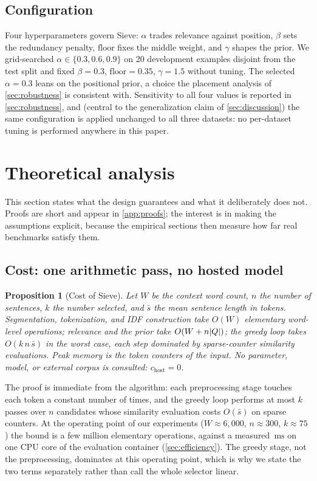 \documentclass[preprint,12pt]{elsarticle}
\DeclarePairedDelimiter\abs{\lvert}{\rvert}
\newtheorem{proposition}{Proposition}
\theoremstyle{remark}
\newcommand{\method}{Sieve}
\newcommand{\ms}{\ensuremath{\mathrm{ms}}}
\begin{document}
\subsection{Configuration}
Four hyperparameters govern \method{}: $\alpha$ trades relevance
against position, $\beta$ sets the redundancy penalty, $\mathrm{floor}$
fixes the middle weight, and $\gamma$ shapes the prior. We
grid-searched $\alpha \in \{0.3, 0.6, 0.9\}$ on 20 development
examples disjoint from the test split and fixed $\beta=0.3$,
$\mathrm{floor}=0.35$, $\gamma=1.5$ without tuning. The selected
$\alpha=0.3$ leans on the positional prior, a choice the placement
analysis of \autoref{sec:robustness} is consistent with. Sensitivity
to all four values is reported in \autoref{sec:robustness}, and
(central to the generalization claim of \autoref{sec:discussion}) the
same configuration is applied unchanged to all three datasets: no
per-dataset tuning is performed anywhere in this paper.

\section{Theoretical analysis}
\label{sec:theory}
This section states what the design guarantees and what it
deliberately does not. Proofs are short and appear in
\autoref{app:proofs}; the interest is in making the assumptions
explicit, because the empirical sections then measure how far real
benchmarks satisfy them.

\subsection{Cost: one arithmetic pass, no hosted model}
\begin{proposition}[Cost of \method{}]
\label{prop:cost}
Let $W$ be the context word count, $n$ the number of sentences, $k$
the number selected, and $\bar{s}$ the mean sentence length in tokens.
Segmentation, tokenization, and IDF construction take $O(W)$
elementary word-level operations; relevance and the prior take
$O(W + n\abs{Q})$; the greedy loop takes $O(k\,n\,\bar{s})$ in the
worst case, each step dominated by sparse-counter similarity
evaluations. Peak memory is the token counters of the input. No
parameter, model, or external corpus is consulted:
$c_{\mathrm{host}} = 0$.
\end{proposition}

The proof is immediate from the algorithm: each preprocessing stage
touches each token a constant number of times, and the greedy loop
performs at most $k$ passes over $n$ candidates whose similarity
evaluation costs $O(\bar{s})$ on sparse counters. At the operating
point of our experiments ($W \approx 6{,}000$, $n \approx 300$,
$k \approx 75$) the bound is a few million elementary operations,
against a measured \TimeSieSixk\,\ms{} on one CPU core of the
evaluation container (\autoref{sec:efficiency}). The greedy stage, not
the preprocessing, dominates at this operating point, which is why we
state the two terms separately rather than call the whole selector
linear.
\end{document}
